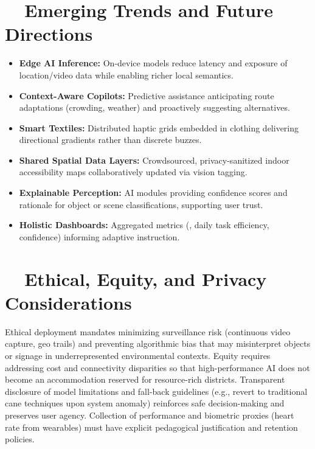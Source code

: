 \section{~~Emerging Trends and Future Directions}\label{ch8:sec:emerging-trends}
\begin{itemize}
	\item \textbf{Edge AI Inference:} On-device models reduce latency and exposure of location/video data while enabling richer local semantics.\supercite{aimodels2024, maitraye2024}
	\item \textbf{Context-Aware Copilots:} Predictive assistance anticipating route adaptations (crowding, weather) and proactively suggesting alternatives.\supercite{bipedai}
	\item \textbf{Smart Textiles:} Distributed haptic grids embedded in clothing delivering directional gradients rather than discrete buzzes.
	\item \textbf{Shared Spatial Data Layers:} Crowdsourced, privacy-sanitized indoor accessibility maps collaboratively updated via vision tagging.\supercite{navilens}
	\item \textbf{Explainable Perception:} AI modules providing confidence scores and rationale for object or scene classifications, supporting user trust.\supercite{AI_Ethics_Bias}
	\item \textbf{Holistic  Dashboards:} Aggregated metrics (, daily task efficiency, confidence) informing adaptive instruction.\supercite{StudentOutcomesResearch}
\end{itemize}

\section{~~Ethical, Equity, and Privacy Considerations}\label{ch8:sec:ethics-equity-privacy}
Ethical deployment mandates minimizing surveillance risk (continuous video capture, geo trails) and preventing algorithmic bias that may misinterpret objects or signage in underrepresented environmental contexts.\supercite{DataPrivacyAI, Bias_in_AI} Equity requires addressing cost and connectivity disparities so that high-performance AI  does not become an accommodation reserved for resource-rich districts.\supercite{AEMCenter} Transparent disclosure of model limitations and fall-back guidelines (e.g., revert to traditional cane techniques upon system anomaly) reinforces safe decision-making and preserves user agency. Collection of performance and biometric proxies (heart rate from wearables) must have explicit pedagogical justification and retention policies.

